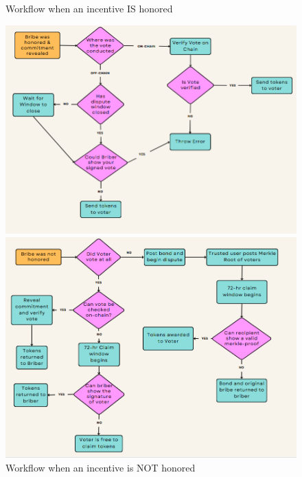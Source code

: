 \documentclass{article}
\begin{document}
\newpage
\begin{figure}[p]
\centering
\caption{Workflow when an incentive IS honored}
\includegraphics[scale=0.433]{../misc/reveal_structure.png}

\centering
\caption{Workflow when an incentive is NOT honored}
\includegraphics[scale=0.4]{../misc/claiming_userflow.png}
\end{figure}
\end{document}
